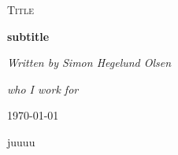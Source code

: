 \documentclass[a4paper,12pt]{article}
\begin{document}
\begin{titlepage}
	\centering
	\vspace{1cm}
	{\scshape\Large Title \par}
	\vspace{1.5cm}
	{\huge\bfseries subtitle \par}
	\vspace{2cm}
	{\Large\itshape Written by Simon Hegelund Olsen\par}
	{\Large\itshape who I work for \par}
	\vfill
	\vfill

	{\large \today\par}
\end{titlepage}

\tableofcontents
\newpage

juuuu
%
% 
\end{document}
